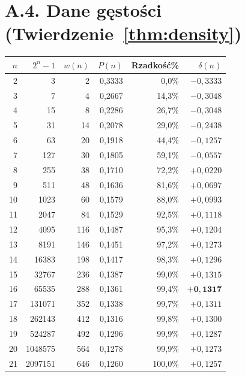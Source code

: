 \newpage
\section*{A.4. Dane gęstości (Twierdzenie~\ref{thm:density})}
\label{subsec:a4-gestosc}

\begin{table}[H]
\centering
\small
\begin{tabular}{r|rrrrr}
\toprule
$n$ & $2^n-1$ & $w(n)$ & $P(n)$ & Rzadkość\% & $\delta(n)$ \\
\midrule
 2 &          3 &    2 & 0{,}3333 &  0{,}0\% & $-0{,}3333$ \\
 3 &          7 &    4 & 0{,}2667 & 14{,}3\% & $-0{,}3048$ \\
 4 &         15 &    8 & 0{,}2286 & 26{,}7\% & $-0{,}3048$ \\
 5 &         31 &   14 & 0{,}2078 & 29{,}0\% & $-0{,}2438$ \\
 6 &         63 &   20 & 0{,}1918 & 44{,}4\% & $-0{,}1257$ \\
 7 &        127 &   30 & 0{,}1805 & 59{,}1\% & $-0{,}0557$ \\
 8 &        255 &   38 & 0{,}1710 & 72{,}2\% & $+0{,}0220$ \\
 9 &        511 &   48 & 0{,}1636 & 81{,}6\% & $+0{,}0697$ \\
10 &       1023 &   60 & 0{,}1579 & 88{,}0\% & $+0{,}0993$ \\
11 &       2047 &   84 & 0{,}1529 & 92{,}5\% & $+0{,}1118$ \\
12 &       4095 &  116 & 0{,}1487 & 95{,}3\% & $+0{,}1204$ \\
13 &       8191 &  146 & 0{,}1451 & 97{,}2\% & $+0{,}1273$ \\
14 &      16383 &  198 & 0{,}1417 & 98{,}3\% & $+0{,}1296$ \\
15 &      32767 &  236 & 0{,}1387 & 99{,}0\% & $+0{,}1315$ \\
16 &      65535 &  288 & 0{,}1361 & 99{,}4\% & $\mathbf{+0{,}1317}$ \\
17 &     131071 &  352 & 0{,}1338 & 99{,}7\% & $+0{,}1311$ \\
18 &     262143 &  412 & 0{,}1316 & 99{,}8\% & $+0{,}1300$ \\
19 &     524287 &  492 & 0{,}1296 & 99{,}9\% & $+0{,}1287$ \\
20 &    1048575 &  564 & 0{,}1278 & 99{,}9\% & $+0{,}1273$ \\
21 &    2097151 &  646 & 0{,}1260 &100{,}0\% & $+0{,}1257$ \\

\end{tabular}
\end{table}

